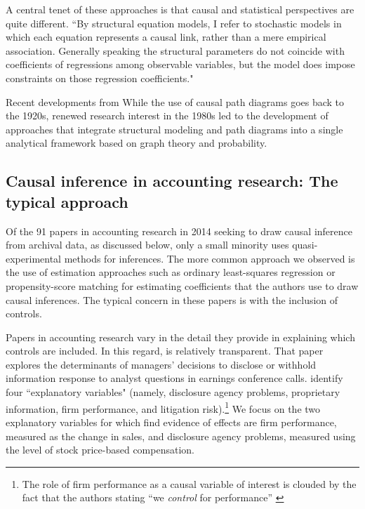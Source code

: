 \documentclass[11pt]{amsart}
\begin{document}



A central tenet of these approaches is that causal and statistical perspectives are quite different. 
``By structural equation models, I refer to stochastic models in which each equation represents a causal link, rather than a mere empirical association. Generally speaking the structural parameters do not coincide with coefficients of regressions among observable variables, but the model does impose constraints on those regression coefficients."


Recent developments from 
While the use of causal path diagrams goes back to the 1920s, %
renewed research interest in the 1980s led to the development of approaches that integrate structural modeling and path diagrams into a single analytical framework based on graph theory and probability.



\subsection{Causal inference in accounting research: The typical approach}
Of the 91 papers in accounting research in 2014 seeking to draw causal inference from archival data, as discussed below, only a small minority uses quasi-experimental methods for inferences.
The more common approach we observed is the use of estimation approaches such as ordinary least-squares regression or propensity-score matching for estimating coefficients that the authors use to draw causal inferences.
The typical concern in these papers is with the inclusion of controls.

Papers in accounting research vary in the detail they provide in explaining which controls are included.
In this regard, \cite{Hollander:2010jg} is relatively transparent. 
That paper explores the determinants of managers' decisions to disclose or withhold information response to analyst questions in earnings conference calls.
\cite{Hollander:2010jg} identify four ``explanatory variables" (namely, disclosure agency problems, proprietary information, firm performance, and litigation risk).\footnote{The role of firm performance as a causal variable of interest is clouded by the fact that the authors stating ``we \emph{control} for performance'' \citep[p.544]{Hollander:2010jg}}
We focus on the two explanatory variables for which \citet{Hollander:2010jg} find evidence of effects are firm performance, measured as the change in sales, and disclosure agency problems, measured using the level of stock price-based compensation.
\end{document}
